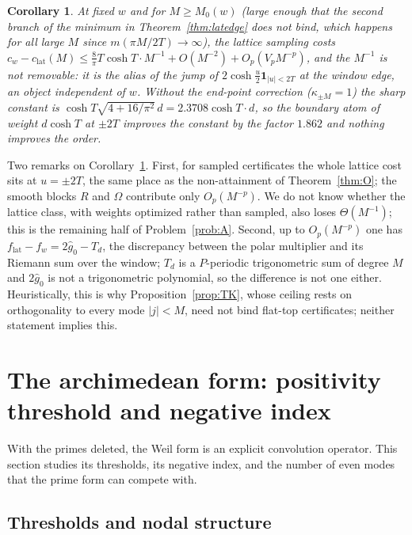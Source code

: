 \documentclass[11pt]{amsart}
\newtheorem{corollary}[theorem]{Corollary}
\theoremstyle{definition}
\theoremstyle{remark}
\newcommand{\gh}[1]{\widehat g_{#1}}
\begin{document}
\begin{corollary}\label{cor:ALdef}
At fixed $w$ and for $M\ge M_0(w)$ (large enough that the second branch of the minimum in
Theorem~\ref{thm:latedge} does not bind, which happens for all large $M$ since $m(\pi M/2T)\to\infty$),
the lattice sampling costs
$c_w-c_{\mathrm{lat}}(M)\le\frac8\pi T\cosh T\cdot M^{-1}+O(M^{-2})+O_p(V_pM^{-p})$, and the
$M^{-1}$ is not removable: it is the alias of the jump of $2\cosh\frac u2\mathbf 1_{|u|<2T}$ at the
window edge, an object independent of $w$. Without the end-point correction
\textup{(}$\kappa_{\pm M}=1$\textup{)} the sharp constant is
$\cosh T\sqrt{4+16/\pi^2}\,d=2.3708\cosh T\cdot d$, so the boundary atom of weight $d\cosh T$ at
$\pm2T$ improves the constant by the factor $1.862$ and nothing improves the order.
\end{corollary}

Two remarks on Corollary~\ref{cor:ALdef}. First, for sampled certificates the whole lattice cost
sits at $u=\pm2T$, the same place as the non-attainment of Theorem~\ref{thm:O}; the smooth blocks $R$
and $\Omega$ contribute only $O_p(M^{-p})$. We do not know whether the lattice class, with weights
optimized rather than sampled, also loses $\Theta(M^{-1})$; this is the remaining half of
Problem~\ref{prob:A}. Second, up to $O_p(M^{-p})$ one has $f_{\mathrm{lat}}-f_w=2\gh0-T_d$, the
discrepancy between the polar multiplier and its Riemann sum over the window; $T_d$ is a
$P$-periodic trigonometric sum of degree $M$ and $2\gh0$ is not a trigonometric polynomial, so the
difference is not one either. Heuristically, this is why Proposition~\ref{prop:TK}, whose ceiling
rests on orthogonality to every mode $|j|<M$, need not bind flat-top certificates; neither
statement implies this.

\section{The archimedean form: positivity threshold and negative index}\label{sec:archstr}

With the primes deleted, the Weil form is an explicit convolution operator. This section studies
its thresholds, its negative index, and the number of even modes that the prime form can compete
with.

\subsection{Thresholds and nodal structure}\label{subsec:arch}
\end{document}
